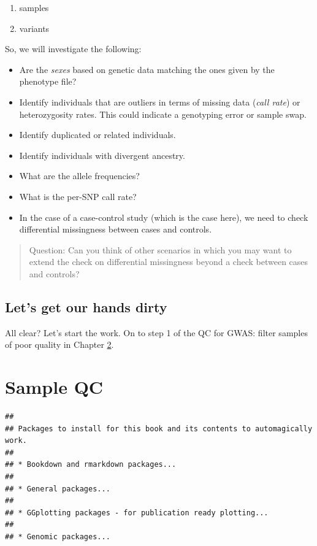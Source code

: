 \documentclass[
]{book}
\providecommand{\tightlist}{%
  \setlength{\itemsep}{0pt}\setlength{\parskip}{0pt}}
\begin{document}
\begin{enumerate}
\def\labelenumi{\arabic{enumi})}
\tightlist
\item
  samples
\item
  variants
\end{enumerate}

So, we will investigate the following:

\begin{itemize}
\tightlist
\item
  Are the \emph{sexes} based on genetic data matching the ones given by the phenotype file?
\item
  Identify individuals that are outliers in terms of missing data (\emph{call rate}) or heterozygosity rates. This could indicate a genotyping error or sample swap.
\item
  Identify duplicated or related individuals.
\item
  Identify individuals with divergent ancestry.
\item
  What are the allele frequencies?
\item
  What is the per-SNP call rate?
\item
  In the case of a case-control study (which is the case here), we need to check differential missingness between cases and controls.
\end{itemize}

\begin{quote}
Question: Can you think of other scenarios in which you may want to extend the check on differential missingness beyond a check between cases and controls?
\end{quote}

\hypertarget{lets-get-our-hands-dirty}{%
\section{Let's get our hands dirty}\label{lets-get-our-hands-dirty}}

All clear? Let's start the work. On to step 1 of the QC for GWAS: filter samples of poor quality in Chapter \ref{gwas-basics-sample-qc}.

\hypertarget{gwas-basics-sample-qc}{%
\chapter{Sample QC}\label{gwas-basics-sample-qc}}

\begin{lstlisting}
## 
## Packages to install for this book and its contents to automagically work.
## 
## * Bookdown and rmarkdown packages...
## 
## * General packages...
## 
## * GGplotting packages - for publication ready plotting...
## 
## * Genomic packages...
\end{lstlisting}
\end{document}
